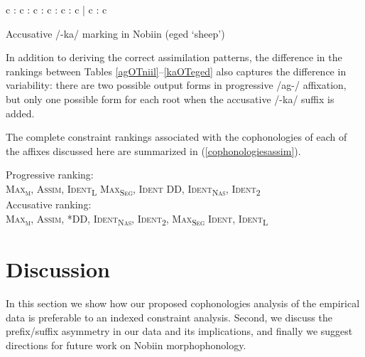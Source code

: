 \documentclass[output=paper]{langscibook}
\begin{document}
\begin{sidewaystable}
\ShadingOn
\begin{tableau}{c : c : c : c : c : c | c : c }
                  
 \vio{*!} \vio{} \vio{} \vio{} \vio{} \vio{*} \vio{} \vio{}
 \vio{*!} \vio{} \vio{} \vio{} \vio{} \vio{*} \vio{} \vio{*}
 \vio{} \vio{*!} \vio{} \vio{} \vio{} \vio{*} \vio{} \vio{}
 \vio{} \vio{} \vio{*!} \vio{} \vio{*} \vio{} \vio{} \vio{*}
 \vio{} \vio{} \vio{} \vio{} \vio{*!} \vio{} \vio{} \vio{}
 \vio{} \vio{} \vio{*!} \vio{} \vio{} \vio{} \vio{} \vio{*}
 \vio{} \vio{} \vio{} \vio{} \vio{} \vio{} \vio{**} \vio{*}
 \vio{} \vio{} \vio{} \vio{} \vio{} \vio{*!} \vio{} \vio{}
\end{tableau}
\caption{Accusative /-ka/ marking in Nobiin (eged `sheep')} \label{kaOTeged}
\end{sidewaystable}


In addition to deriving the correct assimilation patterns, the difference in the rankings between Tables \ref{agOTniil}--\ref{kaOTeged} also captures the difference in variability: there are two possible output forms in progressive /ag-/ affixation, but only one possible form for each root when the accusative /-ka/ suffix is added. 

The complete constraint rankings associated with the cophonologies of each of the affixes discussed here are summarized in (\ref{cophonologiesassim}). 

\ea \label{cophonologiesassim}
Progressive ranking: \\ \textsc{Max\textsubscript{μ}}, \textsc{Assim}, \textsc{Ident\textsubscript{L}} \guillemotright  \textsc{Max\textsubscript{Seg}}, \textsc{Ident} \guillemotright *DD, \textsc{Ident\textsubscript{Nas}}, \textsc{Ident\textsubscript{2}}\\
Accusative ranking: \\  \textsc{Max\textsubscript{μ}}, \textsc{Assim}, *DD, \textsc{Ident\textsubscript{Nas}}, \textsc{Ident\textsubscript{2}}, \textsc{Max\textsubscript{Seg}} \guillemotright \textsc{Ident}, \textsc{Ident\textsubscript{L}}
\z

%
\section{Discussion} \label{discussion}
In this section we show how our proposed cophonologies analysis of the empirical data is preferable to an indexed constraint analysis. Second, we discuss the prefix/suffix asymmetry in our data and its implications, and finally we suggest directions for future work on Nobiin morphophonology.
\end{document}
